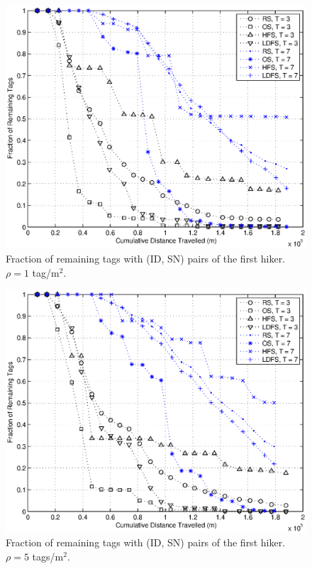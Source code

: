 \begin{figure}
\centering
\includegraphics[width=5in]{Chapter_2_Figures/frac_dense01.eps}
\caption{Fraction of remaining tags with (ID, SN) pairs of the first hiker. $\rho = 1$ tag/m$^2$.}
\label{Figure: frac_dense01.eps}
\end{figure}
\begin{figure}
\centering
\includegraphics[width=5in]{Chapter_2_Figures/frac_dense05.eps}
\caption{Fraction of remaining tags with (ID, SN) pairs of the first hiker. $\rho = 5$ tags/m$^2$.}
\label{Figure: frac_dense05.eps}
\end{figure}
\clearpage

